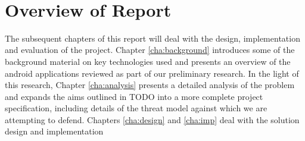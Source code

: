 \\

\section{Overview of Report}
\label{sec:overview}

The subsequent chapters of this report will deal with the design, implementation and evaluation of the project.  Chapter \ref{cha:background} introduces some of the background material on key technologies used and presents an overview of the android applications reviewed as part of our preliminary research.  In the light of this research, Chapter \ref{cha:analysis} presents a detailed analysis of the problem and expands the aims outlined in TODO into a more complete project specification, including details of the threat model against which we are attempting to defend. Chapters \ref{cha:design} and \ref{cha:imp}  deal with the solution design and implementation \\